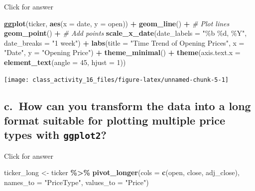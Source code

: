 \documentclass[
]{book}
\newenvironment{Shaded}{\begin{snugshade}}{\end{snugshade}}
\newcommand{\AttributeTok}[1]{\textcolor[rgb]{0.13,0.29,0.53}{#1}}
\newcommand{\CommentTok}[1]{\textcolor[rgb]{0.56,0.35,0.01}{\textit{#1}}}
\newcommand{\DecValTok}[1]{\textcolor[rgb]{0.00,0.00,0.81}{#1}}
\newcommand{\FunctionTok}[1]{\textcolor[rgb]{0.13,0.29,0.53}{\textbf{#1}}}
\newcommand{\NormalTok}[1]{#1}
\newcommand{\OtherTok}[1]{\textcolor[rgb]{0.56,0.35,0.01}{#1}}
\newcommand{\SpecialCharTok}[1]{\textcolor[rgb]{0.81,0.36,0.00}{\textbf{#1}}}
\newcommand{\StringTok}[1]{\textcolor[rgb]{0.31,0.60,0.02}{#1}}
\begin{document}
Click for answer

\begin{Shaded}
\begin{Highlighting}[]
\FunctionTok{ggplot}\NormalTok{(ticker, }\FunctionTok{aes}\NormalTok{(}\AttributeTok{x =}\NormalTok{ date, }\AttributeTok{y =}\NormalTok{ open)) }\SpecialCharTok{+}
  \FunctionTok{geom\_line}\NormalTok{() }\SpecialCharTok{+} \CommentTok{\# Plot lines}
  \FunctionTok{geom\_point}\NormalTok{() }\SpecialCharTok{+} \CommentTok{\# Add points}
  \FunctionTok{scale\_x\_date}\NormalTok{(}\AttributeTok{date\_labels =} \StringTok{"\%b \%d, \%Y"}\NormalTok{, }\AttributeTok{date\_breaks =} \StringTok{"1 week"}\NormalTok{) }\SpecialCharTok{+} 
  \FunctionTok{labs}\NormalTok{(}\AttributeTok{title =} \StringTok{"Time Trend of Opening Prices"}\NormalTok{, }\AttributeTok{x =} \StringTok{"Date"}\NormalTok{, }\AttributeTok{y =} \StringTok{"Opening Price"}\NormalTok{) }\SpecialCharTok{+}
  \FunctionTok{theme\_minimal}\NormalTok{() }\SpecialCharTok{+}
  \FunctionTok{theme}\NormalTok{(}\AttributeTok{axis.text.x =} \FunctionTok{element\_text}\NormalTok{(}\AttributeTok{angle =} \DecValTok{45}\NormalTok{, }\AttributeTok{hjust =} \DecValTok{1}\NormalTok{)) }
\end{Highlighting}
\end{Shaded}

\texttt{[image: class\_activity\_16\_files/figure-latex/unnamed-chunk-5-1]}

\hypertarget{c.-how-can-you-transform-the-data-into-a-long-format-suitable-for-plotting-multiple-price-types-with-ggplot2}{%
\subsection{\texorpdfstring{c.~How can you transform the data into a long format suitable for plotting multiple price types with \texttt{ggplot2}?}{c.~How can you transform the data into a long format suitable for plotting multiple price types with ggplot2?}}\label{c.-how-can-you-transform-the-data-into-a-long-format-suitable-for-plotting-multiple-price-types-with-ggplot2}}

Click for answer

\begin{Shaded}
\begin{Highlighting}[]
\NormalTok{ticker\_long }\OtherTok{\textless{}{-}}\NormalTok{ ticker }\SpecialCharTok{\%\textgreater{}\%}
  \FunctionTok{pivot\_longer}\NormalTok{(}\AttributeTok{cols =} \FunctionTok{c}\NormalTok{(open, close, adj\_close), }\AttributeTok{names\_to =} \StringTok{"PriceType"}\NormalTok{, }\AttributeTok{values\_to =} \StringTok{"Price"}\NormalTok{)}
\end{Highlighting}
\end{Shaded}
\end{document}
